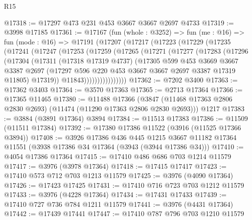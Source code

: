 \begin{lexlean}{R15}
\begin{coremodule}
@17318 := @17297 @473 @231 @453 @3667 @3667 @2697 @4733
@17319 := @3998 @17185
@17361 := @17167
    (fun (whole : @3252) =>
    fun (me : @16) =>
    fun (mode : @16) =>
    @17191
      (@17207
        (@17217
          (@17223
            (@17229
              (@17235
                (@17241
                  (@17247
                    (@17253
                      (@17259
                        (@17265
                          (@17271
                            (@17277
                              (@17283
                                (@17296
                                  (@17304
                                    (@17311
                                      (@17318 @17319 @4737)
                                      (@17305
                                        @599
                                        @453
                                        @3669
                                        @3667
                                        @3387
                                        @2697
                                        (@17297
                                          @596
                                          @220
                                          @453
                                          @3667
                                          @3667
                                          @2697
                                          @3387
                                          @17319
                                          @11805)
                                        @17319))
                                    @11843))))))))))))))))
@17362 := @7202 @3400
@17363 := @17362 @3403
@17364 := @3570 @17363
@17365 := @2713 @17364
@17366 := @17365 @11465
@17380 := @11488
    @17366
    (@3847 (@11468 @17363 @2806 @2830 @2693) (@11474 (@11290 @17363 @2806 @2830 @2693)))
    @1217
@17383 := @3884 (@3891 @17364) @3894
@17384 := @11513 @17383
@17386 := @11509 (@11511 @17384)
@17392 := @17380 @17386 @11522 (@3916 (@11525 @17366 @3894))
@17408 := @3926
    @17386
    @436
    @445
    @1215
    @3667
    @11182
    @17364
    @11551
    (@3938 @17386 @34 @17364 (@3943 (@3944 @17386 @34)))
@17410 := @4054 @17386 @17364
@17415 := @17410 @486 @686 @703 @1214 @11579
@17417 := @3976 (@3978 @17364)
@17418 := @17415 @17417
@17423 := @17410 @573 @712 @703 @1213 @11579
@17425 := @3976 (@4090 @17364)
@17426 := @17423 @17425
@17431 := @17410 @716 @723 @703 @1212 @11579
@17433 := @3976 (@4228 @17364)
@17434 := @17431 @17433
@17439 := @17410 @727 @736 @784 @1211 @11579
@17441 := @3976 (@4431 @17364)
@17442 := @17439 @17441
@17447 := @17410 @787 @796 @703 @1210 @11579

\end{coremodule}
\end{lexlean}
